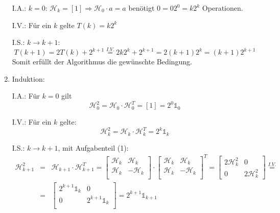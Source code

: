 \begin{enumerate}[1.]
	I.A.: $k = 0$: $\mathcal{H}_k = [1] \Rightarrow \mathcal{H}_0 \cdot a = a$ benötigt $0 = 0 2^0 = k 2^k$ Operationen.

	I.V.: Für ein $k$ gelte $T(k) = k 2^k$

	I.S.: $k \rightarrow k + 1$:
	\[T(k+1) = 2 T(k) + 2^{k+1} \overset{I.V.}{=} 2 k 2^k + 2^{k+1} = 2 (k+1)2^k = (k+1) 2^{k+1} \]
	Somit erfüllt der Algorithmus die gewünschte Bedingung.

	\item Induktion:
	
	I.A.: Für $k = 0$ gilt 
	\[ \mathcal{H}_0^2 = \mathcal{H}_0 \cdot \mathcal{H}_0^T = [1] = 2^0 \mathds{1}_0\]
	
	I.V.: Für ein $k$ gelte:
	\[ \mathcal{H}_k^2 = \mathcal{H}_k \cdot \mathcal{H}_k^T = 2^k \mathds{1}_k \]

	I.S.: $k \rightarrow k + 1$, mit Aufgabenteil (1):
	\begin{eqnarray*}
	\mathcal{H}_{k+1}^2 &=& \mathcal{H}_{k+1} \cdot \mathcal{H}_{k+1}^T = \begin{bmatrix}
		\mathcal{H}_k & \mathcal{H}_k \\
		\mathcal{H}_k & -\mathcal{H}_k \\
	\end{bmatrix} \cdot \begin{bmatrix}
		\mathcal{H}_k & \mathcal{H}_k \\
		\mathcal{H}_k & -\mathcal{H}_k \\
	\end{bmatrix}^T =
	\begin{bmatrix}
		2 \mathcal{H}_k^2 & 0 \\
		0 & 2 \mathcal{H}_k^2
	\end{bmatrix} \overset{I.V.}{=} \\
	&=&
	\begin{bmatrix}
		2^{k+1} \mathds{1}_k & 0 \\
		0 & 2^{k+1}\mathds{1}_k \\
	\end{bmatrix} = 
	2^{k+1} \mathds{1}_{k+1}
	\end{eqnarray*}

\end{enumerate}
